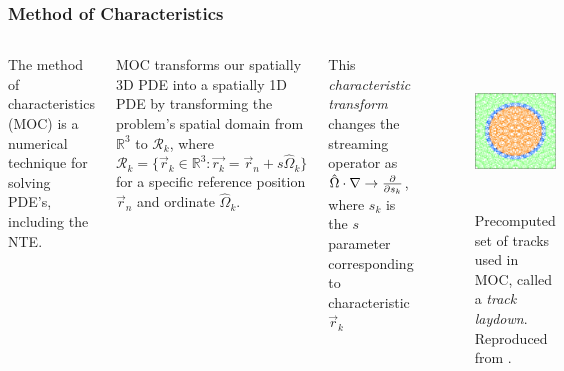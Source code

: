 \begin{frame}
  \frametitle{Method of Characteristics}
    \begin{columns}
      \column[t]{5cm}
        The method of characteristics (MOC) is a numerical technique for solving PDE's,
        including the NTE. 
        
        MOC transforms our spatially 3D PDE into a spatially 1D PDE by
        transforming the problem's spatial domain from $\mathbb{R}^{3}$
        to $\mathcal{R}_k$, where
        \begin{equation}
            \label{eq:R_k}
            \mathcal{R}_k = \{\vec{r}_k \in \mathbb{R}^3 : \vec{r_k} = \vec{r}_n + s \hat{\Omega}_k \}
        \end{equation}
        for a specific reference position $\vec{r}_n$ and ordinate $\hat{\Omega}_k$.
        
        This {\it characteristic transform} changes the streaming operator as
        $\hat{\Omega} \cdot \nabla
        \rightarrow \frac{\partial}{\partial s_k}$, where $s_k$ is the $s$ parameter corresponding to
        characteristic $\vec{r}_k$

      \column[t]{5cm}
        \begin{figure}[htbp!]
          \begin{center}
            \includegraphics[height=4cm]{./figs/tramm-csg-tracks.png}
          \end{center}
          \caption{Precomputed set of tracks used in MOC, called a {\it track
          laydown}. Reproduced from \cite{tramm_development_2018}.}
          \label{fig:moc-tracks}
        \end{figure}
      \end{columns}
\end{frame}
